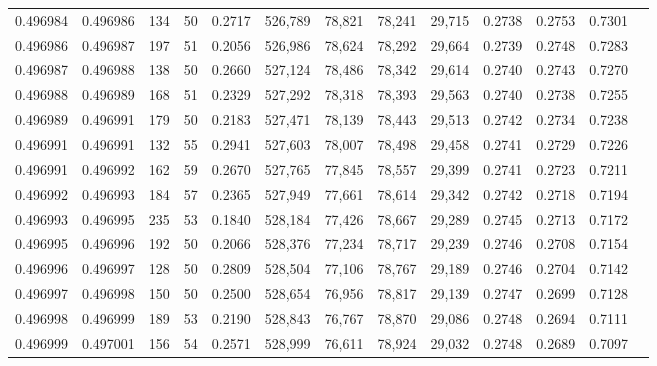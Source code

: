 \begin{tabular}{rrrrrrrrrrrrr}
0.496984 & 0.496986 &   134 &  50 &                                     0.2717 & 526,789 &  78,821 &  78,241 &  29,715 & 0.2738 & 0.2753 & 0.7301 \\
0.496986 & 0.496987 &   197 &  51 &                                     0.2056 & 526,986 &  78,624 &  78,292 &  29,664 & 0.2739 & 0.2748 & 0.7283 \\
0.496987 & 0.496988 &   138 &  50 &                                     0.2660 & 527,124 &  78,486 &  78,342 &  29,614 & 0.2740 & 0.2743 & 0.7270 \\
0.496988 & 0.496989 &   168 &  51 &                                     0.2329 & 527,292 &  78,318 &  78,393 &  29,563 & 0.2740 & 0.2738 & 0.7255 \\
0.496989 & 0.496991 &   179 &  50 &                                     0.2183 & 527,471 &  78,139 &  78,443 &  29,513 & 0.2742 & 0.2734 & 0.7238 \\
0.496991 & 0.496991 &   132 &  55 &                                     0.2941 & 527,603 &  78,007 &  78,498 &  29,458 & 0.2741 & 0.2729 & 0.7226 \\
0.496991 & 0.496992 &   162 &  59 &                                     0.2670 & 527,765 &  77,845 &  78,557 &  29,399 & 0.2741 & 0.2723 & 0.7211 \\
0.496992 & 0.496993 &   184 &  57 &                                     0.2365 & 527,949 &  77,661 &  78,614 &  29,342 & 0.2742 & 0.2718 & 0.7194 \\
0.496993 & 0.496995 &   235 &  53 &                                     0.1840 & 528,184 &  77,426 &  78,667 &  29,289 & 0.2745 & 0.2713 & 0.7172 \\
0.496995 & 0.496996 &   192 &  50 &                                     0.2066 & 528,376 &  77,234 &  78,717 &  29,239 & 0.2746 & 0.2708 & 0.7154 \\
0.496996 & 0.496997 &   128 &  50 &                                     0.2809 & 528,504 &  77,106 &  78,767 &  29,189 & 0.2746 & 0.2704 & 0.7142 \\
0.496997 & 0.496998 &   150 &  50 &                                     0.2500 & 528,654 &  76,956 &  78,817 &  29,139 & 0.2747 & 0.2699 & 0.7128 \\
0.496998 & 0.496999 &   189 &  53 &                                     0.2190 & 528,843 &  76,767 &  78,870 &  29,086 & 0.2748 & 0.2694 & 0.7111 \\
0.496999 & 0.497001 &   156 &  54 &                                     0.2571 & 528,999 &  76,611 &  78,924 &  29,032 & 0.2748 & 0.2689 & 0.7097 \\

\end{tabular}
